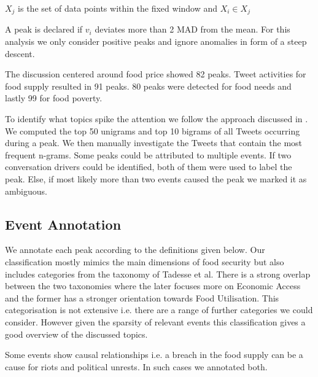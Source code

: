 $X_j$ is the set of data points within the fixed window and $X_i \in X_j$

A peak is declared if $v_i$ deviates more than 2 MAD from the mean. For this analysis we only consider positive peaks and ignore anomalies in form of a steep descent. 

The discussion centered around food price showed 82 peaks. Tweet activities for food supply resulted in 91 peaks. 80 peaks were detected for food needs and lastly 99 for food poverty. 
 

To identify what topics spike the attention we follow the approach discussed in \cite{olt15}. We computed the top 50 unigrams and top 10 bigrams of all Tweets occurring during a peak. We then manually investigate the Tweets that contain the most frequent n-grams. Some peaks could be attributed to multiple events. If two conversation drivers could be identified, both of them were used to label the peak. Else, if most likely more than two events caused the peak we marked it as ambiguous.  

\subsection{Event Annotation}

We annotate each peak according to the definitions given below. Our classification mostly mimics the main dimensions of food security but also includes categories from the taxonomy of Tadesse et al\cite{Tadesse2014}. There is a strong overlap between the two taxonomies where the later focuses more on Economic Access and the former has a stronger orientation towards Food Utilisation. This categorisation is not extensive i.e. there are a range of further categories we could consider. However given the sparsity of relevant events this classification gives a good overview of the discussed topics. 

Some events show causal relationships i.e. a breach in the food supply can be a cause for riots and political unrests. In such cases we annotated both. 


